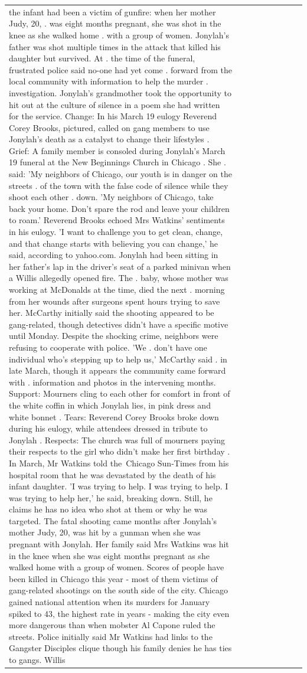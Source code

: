 \begin{table}[H]
\begin{tabular}{lllrlllll}
the infant had been a victim of gunfire: when her mother Judy, 20, . was eight months pregnant, she was shot in the knee as she walked home . with a group of women. Jonylah's father was shot multiple times in the attack that killed his daughter but survived. At . the time of the funeral, frustrated police said no-one had yet come . forward from the local community with information to help the murder . investigation. Jonylah's grandmother took the opportunity to hit out at the culture of silence in a poem she had written for the service. Change: In his March 19 eulogy Reverend Corey Brooks, pictured, called on gang members to use Jonylah's death as a catalyst to change their lifestyles . Grief: A family member is consoled during Jonylah's March 19 funeral at the New Beginnings Church in Chicago . She . said: 'My neighbors of Chicago, our youth is in danger on the streets . of the town with the false code of silence while they shoot each other . down. 'My neighbors of Chicago, take back your home. Don't spare the rod and leave your children to roam.' Reverend Brooks echoed Mrs Watkins' sentiments in his eulogy. 'I want to challenge you to get clean, change, and that change starts with believing you can change,' he said, according to yahoo.com. Jonylah had been sitting in her father's lap in the driver's seat of a parked minivan when a Willis allegedly opened fire. The . baby, whose mother was working at McDonalds at the time, died the next . morning from her wounds after surgeons spent hours trying to save her. McCarthy initially said the shooting appeared to be gang-related, though detectives didn't have a specific motive until Monday. Despite the shocking crime, neighbors were refusing to cooperate with police. 'We . don't have one individual who's stepping up to help us,' McCarthy said . in late March, though it appears the community came forward with . information and photos in the intervening months. Support: Mourners cling to each other for comfort in front of the white coffin in which Jonylah lies, in pink dress and white bonnet . Tears: Reverend Corey Brooks broke down during his eulogy, while attendees dressed in tribute to Jonylah . Respects: The church was full of mourners paying their respects to the girl who didn't make her first birthday . In March, Mr Watkins told the Chicago Sun-Times from his hospital room that he was devastated by the death of his infant daughter. 'I was trying to help. I was trying to help. I was trying to help her,' he said, breaking down. Still, he claims he has no idea who shot at them or why he was targeted. The fatal shooting came months after Jonylah's mother Judy, 20, was hit by a gunman when she was pregnant with Jonylah. Her family said Mrs Watkins was hit in the knee when she was eight months pregnant as she walked home with a group of women. Scores of people have been killed in Chicago this year - most of them victims of gang-related shootings on the south side of the city. Chicago gained national attention when its murders for January spiked to 43, the highest rate in years - making the city even more dangerous than when mobster Al Capone ruled the streets. Police initially said Mr Watkins had links to the Gangster Disciples clique though his family denies he has ties to gangs. Willis 
\end{tabular}
\end{table}
